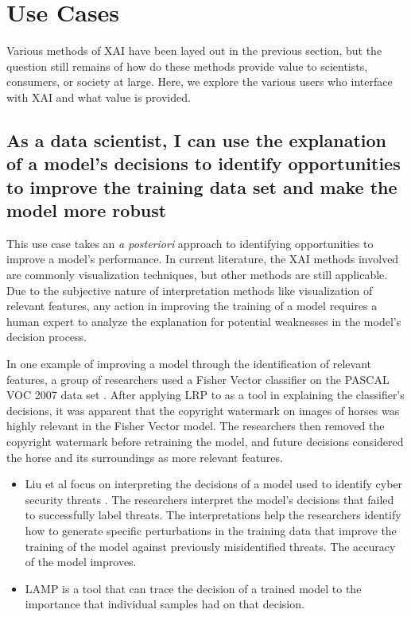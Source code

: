 \section{Use Cases} \label{sec:UseCases}
Various methods of XAI have been layed out in the previous section, but the question still remains of how do these methods provide value to scientists, consumers, or society at large.  Here, we explore the various users who interface with XAI and what value is provided.

\subsection{As a data scientist, I can use the explanation of a model's decisions to identify opportunities to improve the training data set and make the model more robust}

This use case takes an \textit{a posteriori} approach to identifying opportunities to improve a model's performance.  In current literature, the XAI methods involved are commonly visualization techniques, but other methods are still applicable.  Due to the subjective nature of interpretation methods like visualization of relevant features, any action in improving the training of a model requires a human expert to analyze the explanation for potential weaknesses in the model's decision process.

In one example of improving a model through the identification of relevant features, a group of researchers used a Fisher Vector classifier on the PASCAL VOC 2007 data set \cite{Bach2016AnalyzingCF}.  After applying LRP to as a tool in explaining the classifier's decisions, it was apparent that the copyright watermark on images of horses was highly relevant in the Fisher Vector model.  The researchers then removed the copyright watermark before retraining the model, and future decisions considered the horse and its surroundings as more relevant features.

\begin{itemize}
    \item Liu et al focus on interpreting the decisions of a model used to identify cyber security threats \cite{Liu:2018:ADM:3219819.3220027}.  The researchers interpret the model's decisions that failed to successfully label threats.  The interpretations help the researchers identify how to generate specific perturbations in the training data that improve the training of the model against previously misidentified threats.  The accuracy of the model improves.
    \item LAMP is a tool that can trace the decision of a trained model to the importance that individual samples had on that decision. \cite{Ma2017}
\end{itemize}

